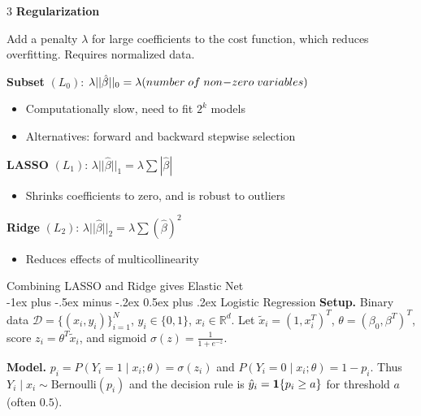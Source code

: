 \documentclass[10pt,landscape]{article}
\makeatletter
\renewcommand{\section}{\@startsection{section}{1}{0mm}%
                                {-1ex plus -.5ex minus -.2ex}%
                                {0.5ex plus .2ex}%
                                {\normalfont\large\bfseries}}
\makeatother
\begin{document}
\begin{multicols}{3}
    \textbf{Regularization}

    Add a penalty $\lambda$ for large coefficients to the cost function, which reduces overfitting. Requires normalized data.

    \textbf{Subset}  $(L_0)$: $\lambda ||\hat{\beta}||_0 = \lambda (number \;of\;non\hspace{-.7mm}-\hspace{-.7mm}zero\; variables)$
    \begin{itemize}[label={--},leftmargin=4mm]
        \vspace{-1mm}
        \itemsep -.4mm
        \item Computationally slow, need to fit $2^k$ models
        \item Alternatives: forward and backward stepwise selection
    \end{itemize}
    \textbf{LASSO} $(L_1)$: $\lambda ||\hat{\beta}||_1 = \lambda\sum | \hat{\beta} |$
    \begin{itemize}[label={--},leftmargin=4mm]
        \vspace{-1mm}
        \itemsep -.4mm
        \item Shrinks coefficients to zero, and is robust to outliers
    \end{itemize}
    \textbf{Ridge}  $(L_2)$: $\lambda ||\hat{\beta}||_2 = \lambda\sum( \hat{\beta})^2$
    \begin{itemize}[label={--},leftmargin=4mm]
        \vspace{-1mm}
        \itemsep -.4mm
        \item Reduces effects of multicollinearity
    \end{itemize}
    Combining LASSO and Ridge gives Elastic Net\\

    \section{Logistic Regression}
    \textbf{Setup.} Binary data $\mathcal{D}=\{(x_i,y_i)\}_{i=1}^N$, $y_i\in\{0,1\}$, $x_i\in\mathbb{R}^d$. Let $\tilde x_i=(1,x_i^T)^T$, $\theta=(\beta_0,\beta^T)^T$, score $z_i=\theta^T\tilde x_i$, and sigmoid $\sigma(z)=\frac{1}{1+e^{-z}}$.

    \textbf{Model.}
    $\displaystyle p_i=P(Y_i{=}1\mid x_i;\theta)=\sigma(z_i)$ and
    $\displaystyle P(Y_i{=}0\mid x_i;\theta)=1-p_i$.
    Thus $Y_i\mid x_i\sim\mathrm{Bernoulli}(p_i)$ and the decision rule is $\hat y_i=\mathbf{1}\{p_i\ge a\}$ for threshold $a$ (often $0.5$).
    \vspace{.2em}


\end{multicols}
\end{document}

